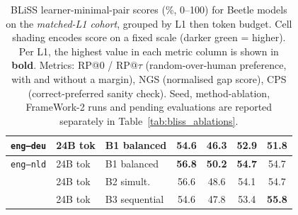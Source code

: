 \begin{table}[t]
\begin{minipage}[t]{0.49\linewidth}
\begin{tabular}{ll l cccc}
\midrule
\texttt{eng--deu} & 24B tok & B1 balanced & \cellcolor[rgb]{0.952,1.000,0.952} \textbf{54.6} & \cellcolor[rgb]{1.000,0.964,0.964} \textbf{46.3} & \cellcolor[rgb]{0.962,1.000,0.962} \textbf{52.9} & \cellcolor[rgb]{0.963,1.000,0.963} \textbf{51.8} \\
\midrule
\texttt{eng--nld} & 24B tok & B1 balanced & \cellcolor[rgb]{0.929,1.000,0.929} \textbf{56.8} & \cellcolor[rgb]{0.997,1.000,0.997} \textbf{50.2} & \cellcolor[rgb]{0.938,1.000,0.938} \textbf{54.7} & \cellcolor[rgb]{0.904,1.000,0.904} 54.7 \\
 & 24B tok & B2 simult. & \cellcolor[rgb]{0.931,1.000,0.931} 56.6 & \cellcolor[rgb]{1.000,0.987,0.987} 48.6 & \cellcolor[rgb]{0.946,1.000,0.946} 54.1 & \cellcolor[rgb]{0.904,1.000,0.904} 54.7 \\
 & 24B tok & B3 sequential & \cellcolor[rgb]{0.952,1.000,0.952} 54.6 & \cellcolor[rgb]{1.000,0.979,0.979} 47.8 & \cellcolor[rgb]{0.955,1.000,0.955} 53.4 & \cellcolor[rgb]{0.881,1.000,0.881} \textbf{55.8} \\
\bottomrule
\end{tabular}
\end{minipage}
\caption{BLiSS learner-minimal-pair scores (\%, 0--100) for Beetle models on the \emph{matched-L1 cohort}, grouped by L1 then token budget. Cell shading encodes score on a fixed scale (darker green = higher). Per L1, the highest value in each metric column is shown in \textbf{bold}. Metrics: RP@0 / RP@$\tau$ (random-over-human preference, with and without a margin), NGS (normalised gap score), CPS (correct-preferred sanity check). Seed, method-ablation, FrameWork-2 runs and pending evaluations are reported separately in Table~\ref{tab:bliss_ablations}.}
\label{tab:bliss_beetle}
\end{table}

